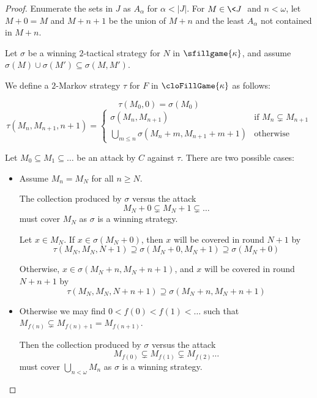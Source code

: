   \begin{proof}
    Enumerate the sets in $J$ as $A_\alpha$ for $\alpha<|J|$. For $M\in \<J\>$ and $n<\omega$, let $M+0=M$ and $M+n+1$ be the union of $M+n$ and the least $A_\alpha$ not contained in $M+n$.

    Let $\sigma$ be a winning $2$-tactical strategy for $N$ in $\sfillgame{\kappa}$, and assume $\sigma(M)\cup\sigma(M')\subseteq\sigma(M,M')$.

    We define a $2$-Markov strategy $\tau$ for $F$ in $\cloFillGame{\kappa}$ as follows:

      \[
        \tau(M_0,0) = \sigma(M_0)
      \]
      \[
        \tau(M_{n},M_{n+1},n+1) = \left\{
          \begin{array}{ll}
            \sigma(M_{n},M_{n+1}) & \text{if } M_n\subsetneq M_{n+1} \\
            \bigcup_{m\leq n}\sigma(M_n+m,M_{n+1}+m+1) & \text{otherwise}
          \end{array}
        \right.
      \]

    Let $M_0 \subseteq M_1 \subseteq \dots$ be an attack by $C$ against $\tau$. There are two possible cases:

      \begin{itemize}
        \item
          Assume $M_n=M_N$ for all $n\geq N$.

          The collection produced by $\sigma$ versus the attack
            \[
              M_N+0 \subsetneq M_N+1 \subsetneq \dots
            \]
          must cover $M_N$ as $\sigma$ is a winning strategy.

          Let $x \in M_N$. If $x\in\sigma(M_N+0)$, then $x$ will be covered in round $N+1$ by
            \[
              \tau(M_N,M_N,N+1)
              \supseteq \sigma(M_N+0,M_N+1)
              \supseteq \sigma(M_N+0)
            \]

          Otherwise, $x\in\sigma(M_N+n,M_N+n+1)$, and $x$ will be covered in round $N+n+1$ by
            \[
              \tau(M_N,M_N,N+n+1)
              \supseteq \sigma(M_N+n,M_N+n+1)
            \]

        \item
          Otherwise we may find $0<f(0)<f(1)<\dots$ such that $M_{f(n)}\subsetneq M_{f(n)+1}=M_{f(n+1)}$.

          Then the collection produced by $\sigma$ versus the attack
            \[
              M_{f(0)}\subsetneq M_{f(1)} \subsetneq M_{f(2)} \dots
            \]
          must cover $\bigcup_{n<\omega}M_n$ as $\sigma$ is a winning strategy.


\end{itemize}
\end{proof}

